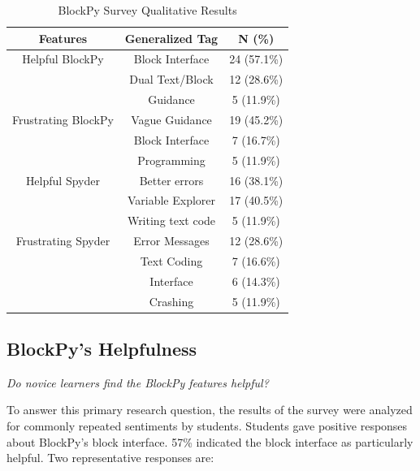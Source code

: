 \documentclass[10pt,journal,compsoc]{IEEEtran}
\begin{document}
\begin{table}[!t]
\renewcommand{\arraystretch}{1.3}
\caption{BlockPy Survey Qualitative Results}
\label{table:blockpy-survey-qualitative}
\centering
\begin{tabular}{c|c|c}
\hline
Features & Generalized Tag & N (\%)\\\hline
Helpful BlockPy & Block Interface & 24 (57.1\%) \\
 & Dual Text/Block & 12 (28.6\%)\\
& Guidance & 5 (11.9\%)\\\hline
Frustrating BlockPy & Vague Guidance & 19 (45.2\%)\\
  & Block Interface & 7 (16.7\%)\\
  & Programming & 5 (11.9\%)\\\hline
Helpful Spyder & Better errors & 16 (38.1\%)\\
& Variable Explorer & 17 (40.5\%)\\
& Writing text code & 5 (11.9\%)\\\hline
Frustrating Spyder & Error Messages & 12 (28.6\%)\\
& Text Coding & 7 (16.6\%)\\
& Interface & 6 (14.3\%)\\
& Crashing & 5 (11.9\%)

\end{tabular}
\end{table}

    
\subsection{BlockPy's Helpfulness}

\textit{Do novice learners find the BlockPy features helpful?}

To answer this primary research question, the results of the survey were analyzed for commonly repeated sentiments by students.
Students gave positive responses about BlockPy's block interface.
57\% indicated the block interface as particularly helpful.
Two representative responses are:
\end{document}
